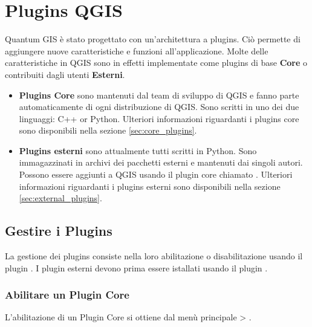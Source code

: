 
\section{Plugins QGIS }\label{sec:plugins}


Quantum GIS è stato progettato con un’architettura a plugins. Ciò permette di aggiungere nuove caratteristiche e funzioni all’applicazione. Molte delle caratteristiche in QGIS sono in effetti implementate come plugins di base \textbf{Core} o contribuiti dagli utenti \textbf{Esterni}. 

\begin{itemize}
\item \textbf{Plugins Core} sono mantenuti dal team di sviluppo di QGIS e fanno parte automaticamente di ogni distribuzione di QGIS.
Sono scritti in uno dei due linguaggi: C++ or Python.
Ulteriori informazioni riguardanti i plugins core sono disponibili nella sezione  \ref{sec:core_plugins}.
\item \textbf{Plugins esterni} sono attualmente tutti scritti in Python.
Sono immagazzinati in archivi dei pacchetti esterni e mantenuti dai singoli autori.
Possono essere aggiunti a QGIS usando il plugin core chiamato .
Ulteriori informazioni riguardanti i plugins esterni sono disponibili nella sezione \ref{sec:external_plugins}.
\end{itemize}

\subsection{Gestire i Plugins}\label{sec:managing_plugins}

La gestione dei plugins consiste nella loro abilitazione o disabilitazione usando il plugin .
I plugin esterni devono prima essere istallati usando  il plugin .

\subsubsection{Abilitare un Plugin Core}\label{sec:load_core_plugin} 

L'abilitazione di un Plugin Core si ottiene dal menù principale  > .

